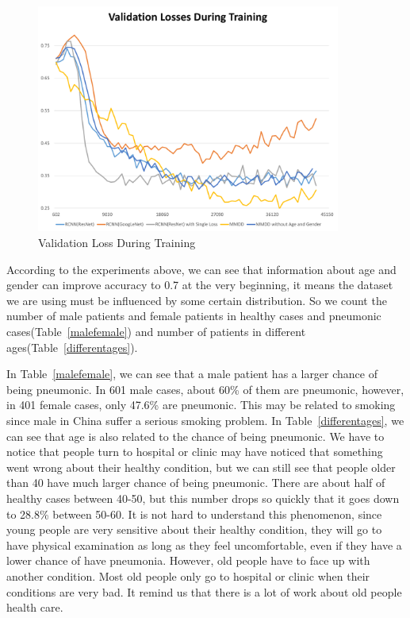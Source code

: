 \documentclass[runningheads]{llncs}
\begin{document}
\begin{figure}[htb]
    \centerline{\includegraphics[width=100mm]{losses.pdf}}
    \vspace{-0cm}
    \caption{Validation Loss During Training}
    \vspace{-0cm}
    \label{loss}
    \end{figure}

According to the experiments above, we can see that information about age and gender can improve accuracy to 0.7 at the very beginning, it means the dataset we are using must be influenced by some certain distribution. So we count the number of male patients and female patients in healthy cases and pneumonic cases(Table~\ref{malefemale}) and number of patients in different ages(Table~\ref{differentages}). 

In Table~\ref{malefemale}, we can see that a male patient has a larger chance of being pneumonic. In 601 male cases, about 60\% of them are pneumonic, however, in 401 female cases, only 47.6\% are pneumonic. This may be related to smoking since male in China suffer a serious smoking problem. 
In Table~\ref{differentages}, we can see that age is also related to the chance of being pneumonic. We have to notice that people turn to hospital or clinic may have noticed that something went wrong about their healthy condition, but we can still see that people older than 40 have much larger chance of being pneumonic. There are about half of healthy cases between 40-50, but this number drops so quickly that it goes down to 28.8\% between 50-60. It is not hard to understand this phenomenon, since young people are very sensitive about their healthy condition, they will go to have physical examination as long as they feel uncomfortable, even if they have a lower chance of have pneumonia. However, old people have to face up with another condition. Most old people only go to hospital or clinic when their conditions are very bad. It remind us that there is a lot of work about old people health care.
\end{document}
